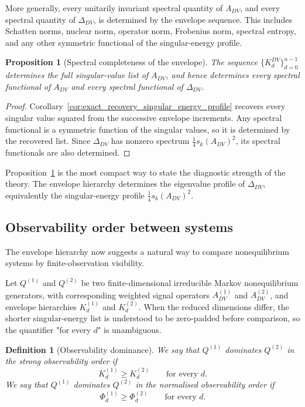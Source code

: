 \documentclass[11pt,a4paper]{article}
\numberwithin{equation}{section}
\theoremstyle{thmcompact}
\newtheorem{proposition}[theorem]{Proposition}
\newtheorem{definition}[theorem]{Definition}
\theoremstyle{remark}
\begin{document}
More generally, every unitarily invariant spectral quantity of \(A_{DV}\), and every spectral quantity of \(\Delta_{DV}\), is determined by the envelope sequence. This includes Schatten norms, nuclear norm, operator norm, Frobenius norm, spectral entropy, and any other symmetric functional of the singular-energy profile.

\begin{proposition}[Spectral completeness of the envelope]
\label{prop:spectral_completeness_of_envelope}
The sequence \(\{K_d^{DV}\}_{d=0}^{n-1}\) determines the full singular-value list of \(A_{DV}\), and hence determines every spectral functional of \(A_{DV}\) and every spectral functional of \(\Delta_{DV}\).
\end{proposition}

\begin{proof}
Corollary~\ref{cor:exact_recovery_singular_energy_profile} recovers every singular value squared from the successive envelope increments. Any spectral functional is a symmetric function of the singular values, so it is determined by the recovered list. Since \(\Delta_{DV}\) has nonzero spectrum \(\frac14 s_k(A_{DV})^2\), its spectral functionals are also determined.
\end{proof}

Proposition~\ref{prop:spectral_completeness_of_envelope} is the most compact way to state the diagnostic strength of the theory. The envelope hierarchy determines the eigenvalue profile of \(\Delta_{DV}\), equivalently the singular-energy profile \(\tfrac14 s_k(A_{DV})^2\).

\subsection{Observability order between systems}

The envelope hierarchy now suggests a natural way to compare nonequilibrium systems by finite-observation visibility.

Let \(Q^{(1)}\) and \(Q^{(2)}\) be two finite-dimensional irreducible Markov nonequilibrium generators, with corresponding weighted signal operators \(A_{DV}^{(1)}\) and \(A_{DV}^{(2)}\), and envelope hierarchies \(K_d^{(1)}\) and \(K_d^{(2)}\). When the reduced dimensions differ, the shorter singular-energy list is understood to be zero-padded before comparison, so the quantifier "for every \(d\)" is unambiguous.

\begin{definition}[Observability dominance]
\label{def:observability_dominance}
We say that \(Q^{(1)}\) dominates \(Q^{(2)}\) in the strong observability order if
\begin{equation}
K_d^{(1)}\ge K_d^{(2)}
\qquad\text{for every }d.
\end{equation}
We say that \(Q^{(1)}\) dominates \(Q^{(2)}\) in the normalised observability order if
\begin{equation}
\Phi_d^{(1)}\ge \Phi_d^{(2)}
\qquad\text{for every }d.
\end{equation}
\end{definition}
\end{document}
